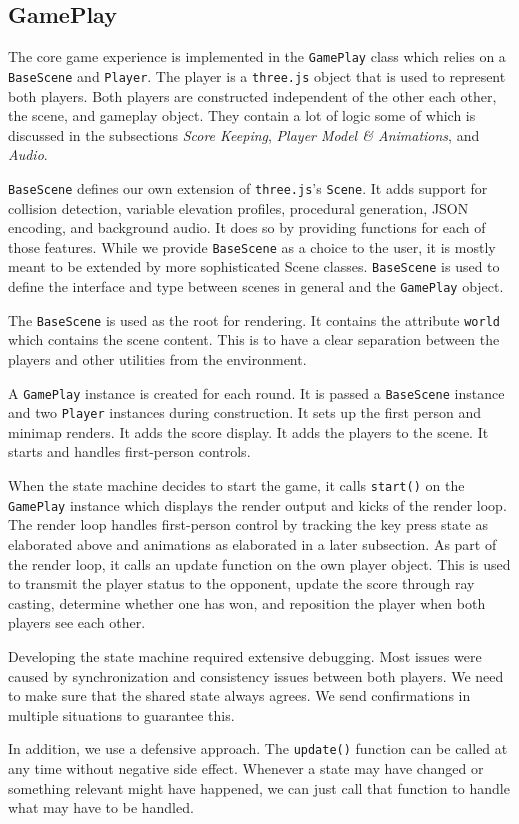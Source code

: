 \documentclass[11pt]{article}
\begin{document}
\subsection{GamePlay}
\par The core game experience is implemented in the \texttt{GamePlay} class which relies on a \texttt{BaseScene} and \texttt{Player}. The player is a \texttt{three.js} object that is used to represent both players. Both players are constructed independent of the other each other, the scene, and gameplay object. They contain a lot of logic some of which is discussed in the subsections \textit{Score Keeping}, \textit{Player Model \& Animations}, and \textit{Audio}.
\par \texttt{BaseScene} defines our own extension of \texttt{three.js}'s \texttt{Scene}. It adds support for collision detection, variable elevation profiles, procedural generation, JSON encoding, and background audio. It does so by providing functions for each of those features. While we provide \texttt{BaseScene} as a choice to the user, it is mostly meant to be extended by more sophisticated Scene classes. \texttt{BaseScene} is used to define the interface and type between scenes in general and the \texttt{GamePlay} object.
\par The \texttt{BaseScene} is used as the root for rendering. It contains the attribute \texttt{world} which contains the scene content. This is to have a clear separation between the players and other utilities from the environment.
\par A \texttt{GamePlay} instance is created for each round. It is passed a \texttt{BaseScene} instance and two \texttt{Player} instances during construction. It sets up the first person and minimap renders. It adds the score display. It adds the players to the scene. It starts and handles first-person controls.
\par When the state machine decides to start the game, it calls \texttt{start()} on the \texttt{GamePlay} instance which displays the render output and kicks of the render loop. The render loop handles first-person control by tracking the key press state as elaborated above and animations as elaborated in a later subsection. As part of the render loop, it calls an update function on the own player object. This is used to transmit the player status to the opponent, update the score through ray casting, determine whether one has won, and reposition the player when both players see each other.
\par Developing the state machine required extensive debugging. Most issues were caused by synchronization and consistency issues between both players. We need to make sure that the shared state always agrees. We send confirmations in multiple situations to guarantee this.
\par In addition, we use a defensive approach. The \texttt{update()} function can be called at any time without negative side effect. Whenever a state may have changed or something relevant might have happened, we can just call that function to handle what may have to be handled.
\end{document}
